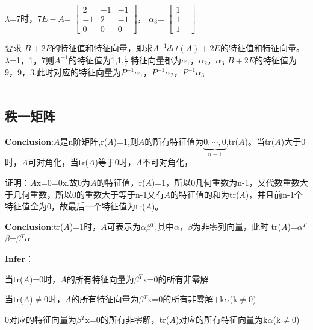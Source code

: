 \documentclass[a4paper,12pt]{book}
\begin{document}
   
   $\lambda$=7时，$\mathit{7E-A}$=
   $\begin{bmatrix}
   	2& -1 & -1\\
   	-1&  2& -1\\
   	0& 0 &0
   \end{bmatrix}$，
   $\alpha$$_{3}$=
   $\begin{bmatrix}
   	1& \\
   	1& \\
   	1& 
   \end{bmatrix}$
   
   要求 $\mathit{B+2E}$的特征值和特征向量，即求$\mathit{A^{-1}det(A)+2E}$的特征值和特征向量。
   $\lambda$=1，1，7则$\mathit{A^{-1}}$的特征值为1,1,$\frac{1}{7}$
   特征向量都为$\alpha$$_{1}$，$\alpha$$_{2}$，$\alpha$$_{3}$
   $\mathit{B+2E}$的特征值为9，9，3.此时对应的特征向量为$\mathit{P}$$^{-1}$$\alpha$$_{1}$，$\mathit{P}$$^{-1}$$\alpha$$_{2}$，$\mathit{P}$$^{-1}$$\alpha$$_{3}$
   ~\\
   ~\\
   
\subsection{秩一矩阵}

  $\mathbf{Conclusion}$:$\mathit{A}$是n阶矩阵,r($\mathit{A}$)=1,则$\mathit{A}$的所有特征值为$\underset{n-1}{\underbrace{0,\cdots ,0} } $,tr($\mathit{A}$)。当tr($\mathit{A}$)大于0时，$\mathit{A}$可对角化，当tr($\mathit{A}$)等于0时，$\mathit{A}$不可对角化，
  
  证明：$\mathit{A}$x=0=0x.故0为$\mathit{A}$的特征值，r($\mathit{A}$)=1，所以0几何重数为n-1，又代数重数大于几何重数，所以0的重数大于等于n-1又有$\mathit{A}$的特征值的和为tr($\mathit{A}$)，并且前n-1个特征值全为0，故最后一个特征值为tr($\mathit{A}$)。
  
  $\mathbf{Conclusion}$:tr($\mathit{A}$)=1时，$\mathit{A}$可表示为$\alpha$$\beta$$^{T}$,其中$\alpha$，$\beta$为非零列向量，此时
  tr($\mathit{A}$)=$\alpha$$^{T}$$\beta$=$\beta$$^{T}$$\alpha$
  
  $\mathbf{Infer}$：
  
  当tr($\mathit{A}$)=0时，$\mathit{A}$的所有特征向量为$\beta$$^{T}$x=0的所有非零解
  
  当tr($\mathit{A}$)$\ne$0时，$\mathit{A}$的所有特征向量为$\beta$$^{T}$x=0的所有非零解+k$\alpha$(k$\ne$0)
  
  0对应的特征向量为$\beta$$^{T}$x=0的所有非零解，tr($\mathit{A}$)对应的所有特征向量为k$\alpha$(k$\ne$0)
  
\end{document}
